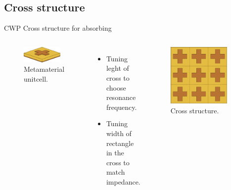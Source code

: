 \subsection{Cross structure}

\begin{frame}{CWP Cross structure for absorbing}
    \begin{columns}
        
        \begin{figure}
            \centering
            \includegraphics[width=0.9\textwidth]{Figures/3D_Meta.pdf}
            \caption{Metamaterial unitcell.}
            \label{fig:Meta_unitcell}
        \end{figure}

        \begin{itemize}
            \item Tuning leght of cross to choose resonance frequency.
            \item Tuning width of rectangle in the cross to match impedance.
        \end{itemize}
        
        
        \begin{figure}
            \centering
            \includegraphics[width=0.9\textwidth]{Figures/Meta_full_structure.pdf}
            \caption{Cross structure.}
            \label{fig:Meta_cross_full_structure}
        \end{figure}
    \end{columns}
\end{frame}
